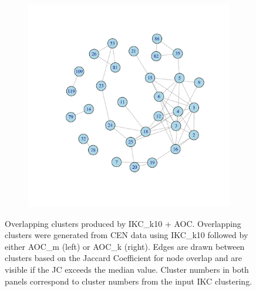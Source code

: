 \documentclass[12pt, oneside]{article}   	%
\begin{document}
\begin{figure}[H]
\begin{subfigure}[t]{0.48\textwidth}
        \includegraphics[width=\linewidth]{ikc10_k_pw.pdf} 
    	\end{subfigure}
\caption{Overlapping clusters produced by IKC\_k10 + AOC.  Overlapping clusters were generated from CEN data using IKC\_k10 followed by either AOC\_m (left) or AOC\_k (right). Edges are drawn between clusters based on the Jaccard Coefficient for node overlap and are visible if the JC exceeds the median value. Cluster numbers in both panels correspond to cluster numbers from the input IKC clustering.}
\label{fig:overlapping}
\end{figure}
\end{document}
